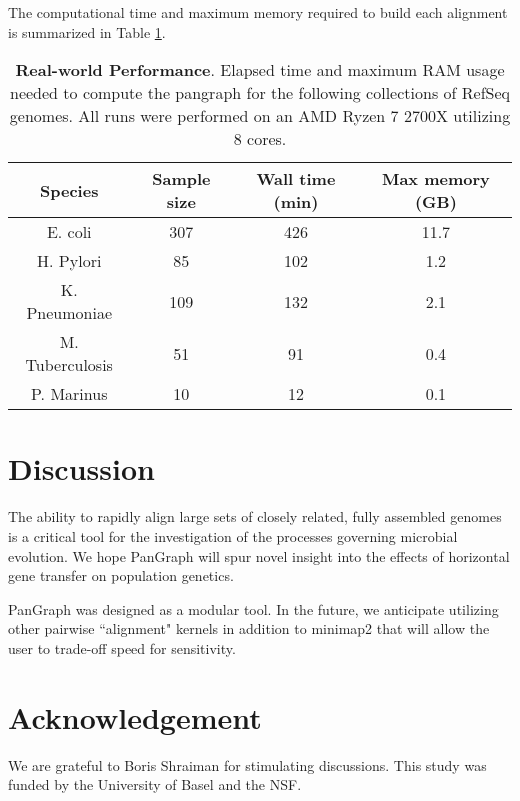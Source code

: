 \documentclass[aps,rmp,reprint,superscriptaddress,notitlepage,10pt]{revtex4-1}
\begin{document}
The computational time and maximum memory required to build each alignment is summarized in Table \ref{table:panx-performance}.

\begin{table}[hb]
    \caption{{\bf Real-world Performance}.
    Elapsed time and maximum RAM usage needed to compute the pangraph for the following collections of RefSeq genomes.
    All runs were performed on an AMD Ryzen 7 2700X utilizing 8 cores.
    }
    \begin{tabular}{c c c c}
    \hline\hline
    Species & Sample size & Wall time (min) & Max memory (GB) \\
    \hline
    E. coli         & 307 & 426 & 11.7 \\
    H. Pylori       & 85 & 102 & 1.2 \\
    K. Pneumoniae   & 109 & 132 & 2.1 \\
    M. Tuberculosis & 51 & 91 & 0.4 \\
    P. Marinus      & 10 & 12 & 0.1 \\
    \hline
    \end{tabular}
    \label{table:panx-performance}
\end{table}

\section{Discussion}
The ability to rapidly align large sets of closely related, fully assembled genomes is a critical tool for the investigation of the processes governing microbial evolution.
We hope PanGraph will spur novel insight into the effects of horizontal gene transfer on population genetics.

PanGraph was designed as a modular tool.
In the future, we anticipate utilizing other pairwise ``alignment" kernels in addition to minimap2 that will allow the user to trade-off speed for sensitivity.

\section*{Acknowledgement}
We are grateful to Boris Shraiman for stimulating discussions.
This study was funded by the University of Basel and the NSF.

\clearpage

{}
\end{document}
